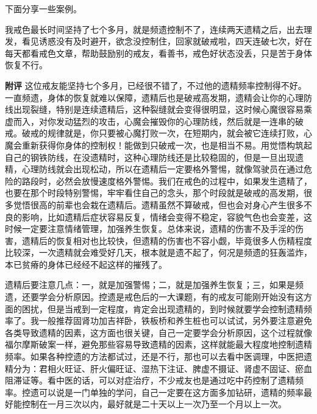 下面分享一些案例。

\begin{case}
    我戒色最长时间坚持了七个多月，就是频遗控制不了，连续两天遗精之后，出去理发，看见诱惑没有及时避开，欲念没控制住，回家就破戒啦，四天连破七次，好在每天都看戒色文章，帮助鼓励别的戒友，看善书，戒色好状态没丢，只是苦于身体恢复不行。

    \textbf{附评} 这位戒友能坚持七个多月，已经很不错了，不过他的遗精频率控制得不好。一直频遗，身体的恢复就难以保障，遗精后也是破戒高发期，遗精会让你的心理防线出现裂缝，特别是连续遗精后，这种裂缝就会变得很明显，这时候心魔很容易乘虚而入，对你发动猛烈的攻击，心魔会摧毁你的心理防线，然后就是一连串的破戒。破戒的规律就是，你只要被心魔打败一次，在短期内，就会被它连续打败，心魔会重新获得你身体的控制权！能做到只破戒一次，也是相当不易。用觉悟构筑起自己的钢铁防线，在没遗精时，这种心理防线还是比较稳固的，但是一旦出现遗精，心理防线就会出现松动，所以在遗精后一定要格外警惕，就像驾驶员在通过危险的路段时，必然会放慢速度格外警惕。我们在戒色的过程中，如果发生遗精了，也要在那个时段特别警惕，牢牢看住自己的念头，那个时段就是破戒的高发期，很多觉悟很高的前辈也会栽在遗精后。遗精虽然不算破戒，但也会对身心产生很多不良的影响，比如遗精后症状容易反复，情绪会变得不稳定，容貌气色也会变差，这时候一定要注意情绪管理，加强养生恢复。总体来说，遗精的伤害不及手淫的伤害，遗精后的恢复相对也比较快，但遗精的伤害也不容小觑，毕竟很多人伤精程度比较深，一次遗精就会难受好几天，根本就是遗不起了，何况是频遗的狂轰滥炸，本已贫瘠的身体已经经不起这样的摧残了。

    遗精后要注意几点：一，就是加强警惕；二，就是加强养生恢复；三，如果是频遗，还要学会分析原因。控遗是戒色后的一大课题，有的戒友可能刚开始没有这方面的困扰，但是当戒到一定程度，肯定会出现遗精的，到时候就要学会控制遗精频率了。我一般推荐固肾功加吉祥卧，铁板桥和养生桩也可以试试，另外要注意避免各类导致遗精的因素，这方面也很关键，自己一定要学会分析原因，这个过程就像福尔摩斯破案一样，避免那些容易导致遗精的因素，这样就能最大程度地控制遗精频率。如果各种控遗的方法都试过，还是不行，那也可以去看中医调理，中医把遗精分为：君相火旺证、肝火偏旺证、湿热下注证、脾虚不摄证、肾虚不固证、瘀血阻滞证等。看中医的话，可以对症治疗，不少戒友也是通过吃中药控制了遗精频率。控遗可以说是一门单独的学问，自己一定要在这方面多加钻研，遗精的频率最好能控制在一月三次以内，最好就是二十天以上一次乃至一个月以上一次。
\end{case}

